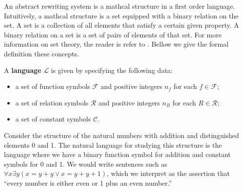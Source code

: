 


An abstract rewriting system is a mathcal structure in a first order language.
Intuitively, a mathcal structure is a set equipped with a binary relation on the set. 
A set is a collection of all elements that satisfy a certain given property. 
A binary relation on a set is a set of pairs of elements of that set. 
For more information on set theory, the reader is refer to \cite{jech2006set}. Bellow we give the formal definition these concepts.
  
\begin{definition}
  A \textbf{language} \( \mathcal{L} \) is given by specifying the following data:
  \begin{itemize}
      \item  a set of function symbols \( \mathcal{F} \) and positive integers \( n_f \) for each \( f \mathop{\in} \mathcal{F} \);
      \item  a set of relation symbols \( \mathcal{R} \) and positive integers \( n_R \) for each \( R \mathop{\in} \mathcal{R} \);
      \item  a set of constant symbols \( \mathcal{C} \).
  \end{itemize}
\end{definition}

\begin{example}
  Consider the structure of the natural numbers with addition and distinguished elements 0 and 1. The natural language for studying this structure is the language where we have a binary function symbol for addition and constant symbols for 0 and 1. We would write sentences such as $\forall x \exists y (x \mathop{=} y\mathop{+}y \lor x \mathop{=} y\mathop{+}y +1)$, which we interpret as the assertion that “every number is either even or 1 plus an even number.”
\end{example}

